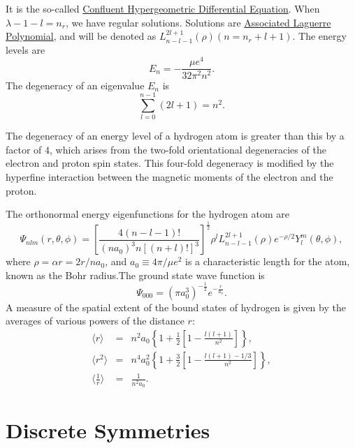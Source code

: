 It is the so-called \href{http://mathworld.wolfram.com/ConfluentHypergeometricDifferentialEquation.html}{Confluent Hypergeometric Differential Equation}.
When $\lambda - 1- l = n_r$, we have regular solutions. Solutions are \href{https://en.wikipedia.org/wiki/Laguerre_polynomials#Generalized_Laguerre_polynomials}{Associated Laguerre Polynomial}, and will be denoted as $L_{n-l-1}^{2l+1}(\rho) (n=n_r+l+1)$. The energy levels are
\[E_n = -\frac{\mu e^4}{32\pi^2 n^2}.\]
The degeneracy of an eigenvalue $E_n$ is
\[\sum_{l=0}^{n-1} (2l+1) = n^2.\]
\begin{note}
The degeneracy of an energy level of a hydrogen atom is greater than this by a factor of $4$, which arises from the two-fold orientational degeneracies of the electron and proton spin states. This four-fold degeneracy is modified by the hyperfine interaction between the magnetic moments of the electron and the proton.
\end{note}
\noindent
The orthonormal energy eigenfunctions for the hydrogen atom are
\[\Psi_{nlm}(r,\theta,\phi) =  \left[ \frac{4(n-l-1)!}{(na_0)^3 n[(n+l)!]^3} \right]^{\frac{1}{2}} \rho^l L_{n-l-1}^{2l+1}(\rho) e^{-\rho/2} Y_l^m (\theta,\phi),\]
where $\rho = \alpha r = {2r}/{na_0}$, and $a_0 \equiv {4\pi}/{\mu e^2}$ is a characteristic length for the
atom, known as the Bohr radius.The ground state wave
function is
\[\Psi_{000} = (\pi a_0^3)^{-\frac{1}{2}} e^{-\frac{r}{a_0}}.\]
A measure of the spatial extent of the bound states of hydrogen is given by the averages of various powers of the distance $r$:
\begin{eqnarray}
\langle r \rangle &=& n^2a_0 \left \{ 1 + \frac{1}{2} \left [ 1 - \frac{l(l+1)}{n^2} \right] \right\} ,\nonumber \\
\langle r^2 \rangle &=& n^4a_0^2 \left \{ 1 + \frac{3}{2} \left [ 1 - \frac{l(l+1)-1/3}{n^2} \right] \right\}, \nonumber \\
\langle \frac{1}{r} \rangle &=& \frac{1}{n^2 a_0}. \nonumber
\end{eqnarray}

\chapter{Discrete Symmetries}
